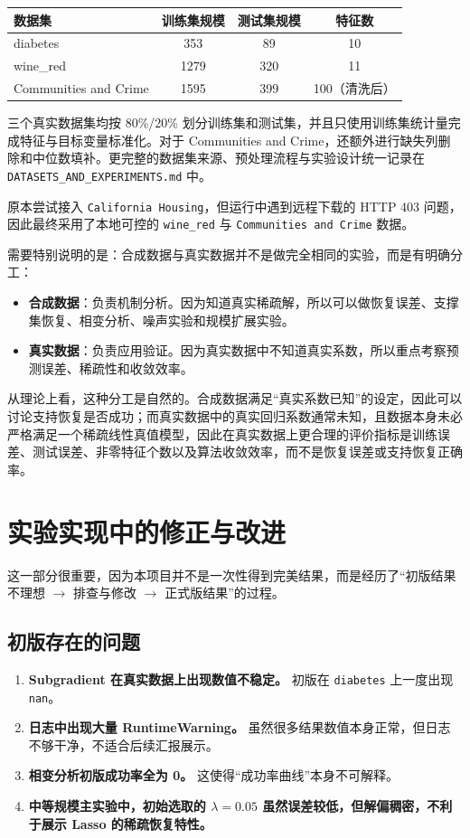 \documentclass[12pt,a4paper]{ctexart}
\begin{document}
\begin{center}
\begin{tabular}{lccc}
\toprule
数据集 & 训练集规模 & 测试集规模 & 特征数 \\
\midrule
diabetes & 353 & 89 & 10 \\
wine\_red & 1279 & 320 & 11 \\
Communities and Crime & 1595 & 399 & 100（清洗后） \\
\bottomrule
\end{tabular}
\end{center}

三个真实数据集均按 80\%/20\% 划分训练集和测试集，并且只使用训练集统计量完成特征与目标变量标准化。对于 Communities and Crime，还额外进行缺失列删除和中位数填补。更完整的数据集来源、预处理流程与实验设计统一记录在 \texttt{DATASETS\_AND\_EXPERIMENTS.md} 中。

原本尝试接入 \texttt{California Housing}，但运行中遇到远程下载的 HTTP 403 问题，因此最终采用了本地可控的 \texttt{wine\_red} 与 \texttt{Communities and Crime} 数据。

需要特别说明的是：合成数据与真实数据并不是做完全相同的实验，而是有明确分工：
\begin{itemize}[leftmargin=2em]
    \item \textbf{合成数据}：负责机制分析。因为知道真实稀疏解，所以可以做恢复误差、支撑集恢复、相变分析、噪声实验和规模扩展实验。
    \item \textbf{真实数据}：负责应用验证。因为真实数据中不知道真实系数，所以重点考察预测误差、稀疏性和收敛效率。
\end{itemize}

从理论上看，这种分工是自然的。合成数据满足“真实系数已知”的设定，因此可以讨论支持恢复是否成功；而真实数据中的真实回归系数通常未知，且数据本身未必严格满足一个稀疏线性真值模型，因此在真实数据上更合理的评价指标是训练误差、测试误差、非零特征个数以及算法收敛效率，而不是恢复误差或支持恢复正确率。

\section{实验实现中的修正与改进}
这一部分很重要，因为本项目并不是一次性得到完美结果，而是经历了“初版结果不理想 $\rightarrow$ 排查与修改 $\rightarrow$ 正式版结果”的过程。

\subsection{初版存在的问题}
\begin{enumerate}[label=\arabic*.]
    \item \textbf{Subgradient 在真实数据上出现数值不稳定。} 初版在 \texttt{diabetes} 上一度出现 \texttt{nan}。
    \item \textbf{日志中出现大量 RuntimeWarning。} 虽然很多结果数值本身正常，但日志不够干净，不适合后续汇报展示。
    \item \textbf{相变分析初版成功率全为 0。} 这使得“成功率曲线”本身不可解释。
    \item \textbf{中等规模主实验中，初始选取的 $\lambda=0.05$ 虽然误差较低，但解偏稠密，不利于展示 Lasso 的稀疏恢复特性。}
\end{enumerate}
\end{document}
